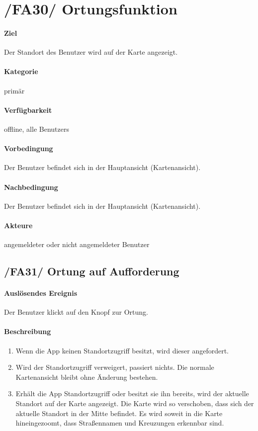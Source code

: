 \section[Ortungsfunktion]{/FA30/ Ortungsfunktion}
\paragraph{Ziel}
Der Standort des \Gls{Benutzer} wird auf der \Gls{Karte} angezeigt.
\paragraph{Kategorie}
primär
\paragraph{Verfügbarkeit}
offline, alle \Glspl{Benutzer}
\paragraph{Vorbedingung}
Der \Gls{Benutzer} befindet sich in der Hauptansicht (\Gls{Kartenansicht}).
\paragraph{Nachbedingung}
Der \Gls{Benutzer} befindet sich in der Hauptansicht (\Gls{Kartenansicht}).
\paragraph{Akteure}
angemeldeter oder nicht angemeldeter \Gls{Benutzer}

\subsection*{/FA31/ Ortung auf Aufforderung}
\label{/FA31/}
\paragraph{Auslösendes Ereignis}
Der \Gls{Benutzer} klickt auf den Knopf zur Ortung.
\paragraph{Beschreibung}
\begin{enumerate}
    \item Wenn die App keinen Standortzugriff besitzt, wird dieser angefordert.
    \item Wird der Standortzugriff verweigert, passiert nichts. Die normale \Gls{Kartenansicht} bleibt ohne Änderung bestehen.
    \item Erhält die App Standortzugriff oder besitzt sie ihn bereits, wird der aktuelle Standort auf der \Gls{Karte} angezeigt. Die \Gls{Karte} wird so verschoben, dass sich der aktuelle Standort in der Mitte befindet. Es wird soweit in die \Gls{Karte} hineingezoomt, dass Straßennamen und Kreuzungen erkennbar sind.
\end{enumerate}

